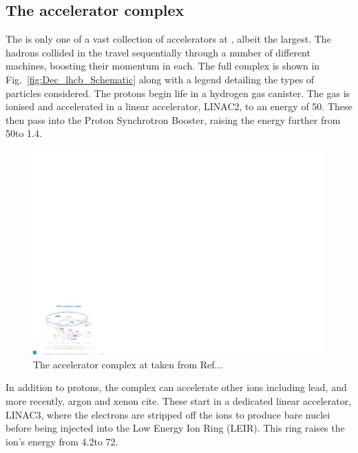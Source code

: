 \subsection{The accelerator complex}

The \lhc is only one of a vast collection of accelerators at \cern, albeit the largest. The hadrons collided in the \lhc travel sequentially through a number of different machines, boosting their momentum in each. The full complex is shown in Fig.~\ref{fig:Dec_lhcb_Schematic} along with a legend detailing the types of particles considered. The protons begin life in a hydrogen gas canister. The gas is ionised and accelerated in  a linear accelerator, LINAC2, to an energy of 50\mev. These then pass into the Proton Synchrotron Booster, raising the energy further from 50\mev to 1.4\gev. 

\begin{figure}[!h]
    \centering
    \includegraphics[width=1.0\textwidth]{figs/Detector/Acc_complex.pdf}
    \caption{The accelerator complex at \cern taken from Ref...}
    \label{fig:Dec_Acc_Complex}   
\end{figure}

In addition to protons, the complex can accelerate other ions including lead, and more recently, argon and xenon {\color{Red}cite}. These start in a dedicated linear accelerator, LINAC3, where the electrons are stripped off the ions to produce bare nuclei before being injected into the Low Energy Ion Ring (LEIR). This ring raises the ion's energy from 4.2\mev to 72\mev. 

